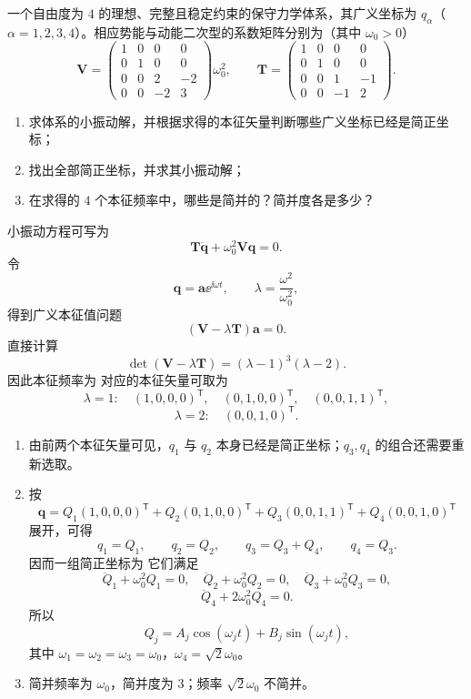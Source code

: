 \begin{question}[四自由度系统的小振动]
一个自由度为 $4$ 的理想、完整且稳定约束的保守力学体系，其广义坐标为 $q_\alpha$（$\alpha=1,2,3,4$）。相应势能与动能二次型的系数矩阵分别为（其中 $\omega_0>0$）
\[
  \mathbf{V}=\begin{pmatrix}
    1&0&0&0\\
    0&1&0&0\\
    0&0&2&-2\\
    0&0&-2&3
  \end{pmatrix}\omega_0^2,
  \qquad
  \mathbf{T}=\begin{pmatrix}
    1&0&0&0\\
    0&1&0&0\\
    0&0&1&-1\\
    0&0&-1&2
  \end{pmatrix}.
\]
\begin{enumerate}
  \item 求体系的小振动解，并根据求得的本征矢量判断哪些广义坐标已经是简正坐标；
  \item 找出全部简正坐标，并求其小振动解；
  \item 在求得的 $4$ 个本征频率中，哪些是简并的？简并度各是多少？
\end{enumerate}

\begin{solution}
小振动方程可写为
\[
  \mathbf T\ddot{\boldsymbol q}+\omega_0^2\mathbf V\boldsymbol q=0.
\]
令
\[
  \boldsymbol q=\boldsymbol a\ee^{\ii\omega t},
  \qquad
  \lambda=\frac{\omega^2}{\omega_0^2},
\]
得到广义本征值问题
\[
  (\mathbf V-\lambda\mathbf T)\boldsymbol a=0.
\]
直接计算
\[
  \det(\mathbf V-\lambda\mathbf T)=(\lambda-1)^3(\lambda-2).
\]
因此本征频率为
对应的本征矢量可取为
\[
  \lambda=1:
  \quad
  (1,0,0,0)^{\mathsf T},\quad
  (0,1,0,0)^{\mathsf T},\quad
  (0,0,1,1)^{\mathsf T},
\]
\[
  \lambda=2:
  \quad
  (0,0,1,0)^{\mathsf T}.
\]
\begin{enumerate}
  \item 由前两个本征矢量可见，$q_1$ 与 $q_2$ 本身已经是简正坐标；$q_3,q_4$ 的组合还需要重新选取。
  \item 按
  \[
    \boldsymbol q=Q_1(1,0,0,0)^{\mathsf T}
    +Q_2(0,1,0,0)^{\mathsf T}
    +Q_3(0,0,1,1)^{\mathsf T}
    +Q_4(0,0,1,0)^{\mathsf T}
  \]
  展开，可得
  \[
    q_1=Q_1,
    \qquad
    q_2=Q_2,
    \qquad
    q_3=Q_3+Q_4,
    \qquad
    q_4=Q_3.
  \]
  因而一组简正坐标为
  它们满足
  \[
    \ddot Q_1+\omega_0^2Q_1=0,
    \quad
    \ddot Q_2+\omega_0^2Q_2=0,
    \quad
    \ddot Q_3+\omega_0^2Q_3=0,
  \]
  \[
    \ddot Q_4+2\omega_0^2Q_4=0.
  \]
  所以
  \[
    Q_j=A_j\cos(\omega_jt)+B_j\sin(\omega_jt),
  \]
  其中 $\omega_1=\omega_2=\omega_3=\omega_0$，$\omega_4=\sqrt2\omega_0$。
  \item 简并频率为 $\omega_0$，简并度为 $3$；频率 $\sqrt2\omega_0$ 不简并。
\end{enumerate}
\end{solution}

\end{question}

